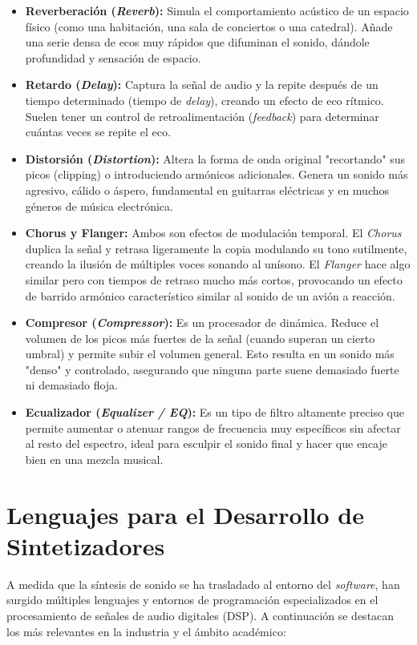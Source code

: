 \begin{itemize}
    \item \textbf{Reverberación (\textit{Reverb}):} Simula el comportamiento acústico de un espacio físico (como una habitación, una sala de conciertos o una catedral). Añade una serie densa de ecos muy rápidos que difuminan el sonido, dándole profundidad y sensación de espacio.
    \item \textbf{Retardo (\textit{Delay}):} Captura la señal de audio y la repite después de un tiempo determinado (tiempo de \textit{delay}), creando un efecto de eco rítmico. Suelen tener un control de retroalimentación (\textit{feedback}) para determinar cuántas veces se repite el eco.
    \item \textbf{Distorsión (\textit{Distortion}):} Altera la forma de onda original "recortando" sus picos (clipping) o introduciendo armónicos adicionales. Genera un sonido más agresivo, cálido o áspero, fundamental en guitarras eléctricas y en muchos géneros de música electrónica.
    \item \textbf{Chorus y Flanger:} Ambos son efectos de modulación temporal. El \textit{Chorus} duplica la señal y retrasa ligeramente la copia modulando su tono sutilmente, creando la ilusión de múltiples voces sonando al unísono. El \textit{Flanger} hace algo similar pero con tiempos de retraso mucho más cortos, provocando un efecto de barrido armónico característico similar al sonido de un avión a reacción.
    \item \textbf{Compresor (\textit{Compressor}):} Es un procesador de dinámica. Reduce el volumen de los picos más fuertes de la señal (cuando superan un cierto umbral) y permite subir el volumen general. Esto resulta en un sonido más "denso" y controlado, asegurando que ninguna parte suene demasiado fuerte ni demasiado floja.
    \item \textbf{Ecualizador (\textit{Equalizer / EQ}):} Es un tipo de filtro altamente preciso que permite aumentar o atenuar rangos de frecuencia muy específicos sin afectar al resto del espectro, ideal para esculpir el sonido final y hacer que encaje bien en una mezcla musical.
\end{itemize}

\section{Lenguajes para el Desarrollo de Sintetizadores}

A medida que la síntesis de sonido se ha trasladado al entorno del \textit{software}, han surgido múltiples lenguajes y entornos de programación especializados en el procesamiento de señales de audio digitales (DSP). A continuación se destacan los más relevantes en la industria y el ámbito académico:

